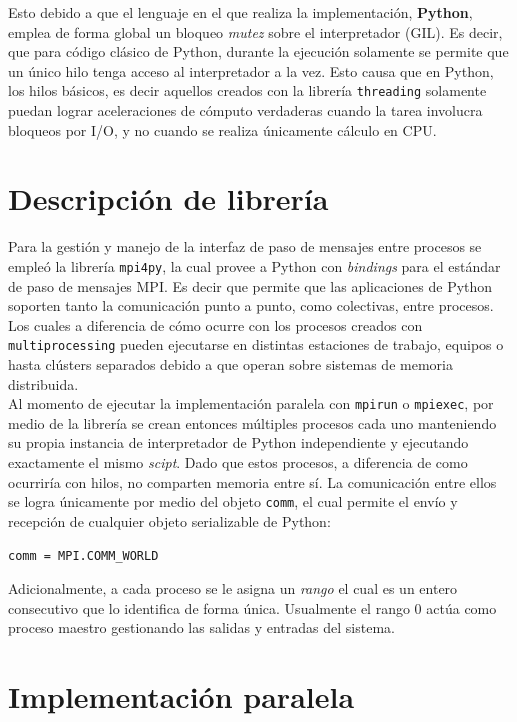 \documentclass{article}
\begin{document}
Esto debido a que el lenguaje en el que realiza la implementación, \textbf{Python}, emplea de forma global un bloqueo \textit{mutez} sobre el interpretador (GIL). Es decir, que para código clásico de Python, durante la ejecución solamente se permite que un único hilo tenga acceso al interpretador a la vez. Esto causa que en Python, los hilos básicos, es decir aquellos creados con la librería \verb|threading| solamente puedan lograr aceleraciones de cómputo verdaderas cuando la tarea involucra bloqueos por I/O, y no cuando se realiza únicamente cálculo en CPU.\\

\section{Descripción de librería}

Para la gestión y manejo de la interfaz de paso de mensajes entre procesos se empleó la librería \verb|mpi4py|, la cual provee a Python con \textit{bindings} para el estándar de paso de mensajes MPI. Es decir que permite que las aplicaciones de Python soporten tanto la comunicación punto a punto, como colectivas, entre procesos. Los cuales a diferencia de cómo ocurre con los procesos creados con \verb|multiprocessing| pueden ejecutarse en distintas estaciones de trabajo, equipos o  hasta clústers separados debido a que operan sobre sistemas de memoria distribuida.\\

Al momento de ejecutar la implementación paralela con \verb|mpirun| o \verb|mpiexec|, por medio de la librería se crean entonces múltiples procesos cada uno manteniendo su propia instancia de interpretador de Python independiente y ejecutando exactamente el mismo \textit{scipt}. Dado que estos procesos, a diferencia de como ocurriría con hilos, no comparten memoria entre sí. La comunicación entre ellos se logra únicamente por medio del objeto \verb|comm|, el cual permite el envío y recepción de cualquier objeto serializable de Python:
\begin{verbatim}
comm = MPI.COMM_WORLD
\end{verbatim}

Adicionalmente, a cada proceso se le asigna un \textit{rango} el cual es un entero consecutivo que lo identifica de forma única. Usualmente el rango $0$ actúa como proceso maestro gestionando las salidas y entradas del sistema. 

\section{Implementación paralela}
\end{document}
